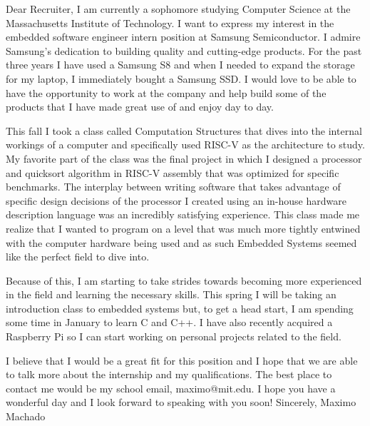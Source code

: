 \documentclass[12pt]{article}
\begin{document}
Dear Recruiter,
I am currently a sophomore studying Computer Science at the Massachusetts Institute of Technology. I want to express my interest in the embedded software engineer intern position at Samsung Semiconductor. I admire Samsung’s dedication to building quality and cutting-edge products. For the past three years I have used a Samsung S8 and when I needed to expand the storage for my laptop, I immediately bought a Samsung SSD. I would love to be able to have the opportunity to work at the company and help build some of the products that I have made great use of and enjoy day to day.

This fall I took a class called Computation Structures that dives into the internal workings of a computer and specifically used RISC-V as the architecture to study. My favorite part of the class was the final project in which I designed a processor and quicksort algorithm in RISC-V assembly that was optimized for specific benchmarks. The interplay between writing software that takes advantage of specific design decisions of the processor I created using an in-house hardware description language was an incredibly satisfying experience. This class made me realize that I wanted to program on a level that was much more tightly entwined with the computer hardware being used and as such Embedded Systems seemed like the perfect field to dive into.

Because of this, I am starting to take strides towards becoming more experienced in the field and learning the necessary skills. This spring I will be taking an introduction class to embedded systems but, to get a head start, I am spending some time in January to learn C and C++. I have also recently acquired a Raspberry Pi so I can start working on personal projects related to the field.

I believe that I would be a great fit for this position and I hope that we are able to talk more about the internship and my qualifications. The best place to contact me would be my school email, maximo@mit.edu. I hope you have a wonderful day and I look forward to speaking with you soon!
Sincerely,
Maximo Machado
\end{document}
